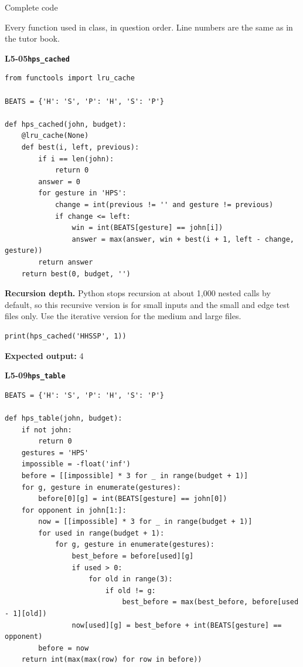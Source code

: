 \documentclass[11pt,a4paper]{article}
\newcommand{\topicflow}[2]{\par\Needspace{20\baselineskip}\bigskip\markboth{#2}{}{\color{quiet}\fontsize{9}{12}\selectfont\textbf{#1}}\par{\heavy\fontsize{19}{23}\selectfont\raggedright #2\par}\vspace{5pt}}
\begin{document}
\topicflow{CODE ANSWERS}{Complete code}
Every function used in class, in question order. Line numbers are the same as in the tutor book.\par\medskip
{}
{\color{teal}\textbf{L5-05}}\quad\textbf{\texttt{hps\_cached}}\label{L5-code-hps_cached}\par
\begin{lstlisting}[style=numbered]
from functools import lru_cache

BEATS = {'H': 'S', 'P': 'H', 'S': 'P'}

def hps_cached(john, budget):
    @lru_cache(None)
    def best(i, left, previous):
        if i == len(john):
            return 0
        answer = 0
        for gesture in 'HPS':
            change = int(previous != '' and gesture != previous)
            if change <= left:
                win = int(BEATS[gesture] == john[i])
                answer = max(answer, win + best(i + 1, left - change, gesture))
        return answer
    return best(0, budget, '')
\end{lstlisting}
\textbf{Recursion depth.} Python stops recursion at about 1,000 nested calls by default, so this recursive version is for small inputs and the small and edge test files only. Use the iterative version for the medium and large files.


\begin{lstlisting}
print(hps_cached('HHSSP', 1))
\end{lstlisting}
\textbf{Expected output:} 4
\par\bigskip
{}
{\color{teal}\textbf{L5-09}}\quad\textbf{\texttt{hps\_table}}\label{L5-code-hps_table}\par
\begin{lstlisting}[style=numbered]
BEATS = {'H': 'S', 'P': 'H', 'S': 'P'}

def hps_table(john, budget):
    if not john:
        return 0
    gestures = 'HPS'
    impossible = -float('inf')
    before = [[impossible] * 3 for _ in range(budget + 1)]
    for g, gesture in enumerate(gestures):
        before[0][g] = int(BEATS[gesture] == john[0])
    for opponent in john[1:]:
        now = [[impossible] * 3 for _ in range(budget + 1)]
        for used in range(budget + 1):
            for g, gesture in enumerate(gestures):
                best_before = before[used][g]
                if used > 0:
                    for old in range(3):
                        if old != g:
                            best_before = max(best_before, before[used - 1][old])
                now[used][g] = best_before + int(BEATS[gesture] == opponent)
        before = now
    return int(max(max(row) for row in before))
\end{lstlisting}
\end{document}
